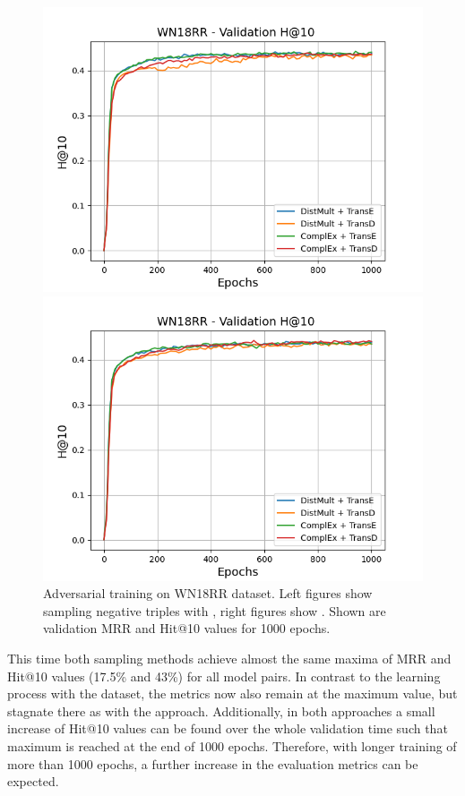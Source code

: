 \begin{figure}[H]
\begin{minipage}{.5\textwidth}
    \end{minipage}
    \begin{minipage}{.5\textwidth}
      \centering
      \includegraphics[width=0.9\linewidth]{figures/results/gan_train/not_pretrained/uncertainty/max/entropy/wn18rr/1k_epochs/uncertainty_wn18rr_hit10.png}
    \end{minipage}%
    \begin{minipage}{.5\textwidth}
      \centering
      \includegraphics[width=0.9\linewidth]{figures/results/gan_train/not_pretrained/uncertainty/max_distribution/entropy/wn18rr/1k_epochs/uncertainty_wn18rr_hit10.png}
    \end{minipage}%
    \caption{Adversarial training on \textsc{WN18RR} dataset. 
    Left figures show sampling negative triples with \usmax, right figures show \ussoftmax.
    Shown are validation MRR and Hit@10 values for 1000 epochs.}
    \label{fig:advtrain_wn18rr_usmax_ussoftmax}
\end{figure}
This time both sampling methods achieve almost the same maxima of MRR and Hit@10 values (17.5\% and 43\%) for all model pairs.
In contrast to the learning process with the \umls dataset, the metrics now also \usmax remain at the maximum value, but stagnate there as with the \ussoftmax approach.
Additionally, in both approaches a small increase of Hit@10 values can be found over the whole validation time such that maximum is reached at the end of 1000 epochs.
Therefore, with longer training of more than 1000 epochs, a further increase in the evaluation metrics can be expected.

